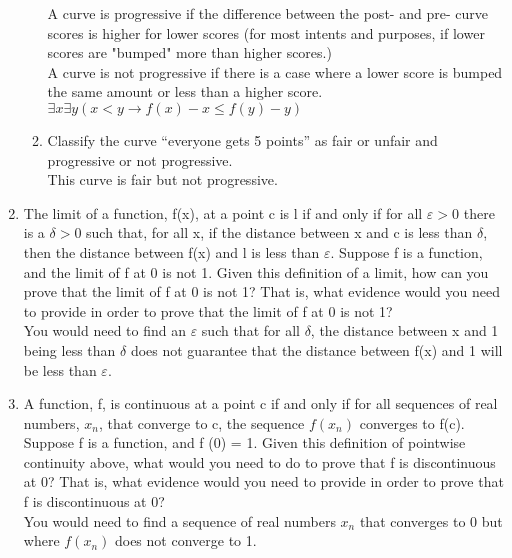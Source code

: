 \documentclass{article}
\begin{document}
\begin{enumerate}
\begin{enumerate}
                        A curve is progressive if the difference between the post- and pre- curve scores is higher for lower scores (for most intents and purposes, if lower scores are "bumped" more than higher scores.)\\
                        A curve is not progressive if there is a case where a lower score is bumped the same amount or less than a higher score. $\exists x \exists y (x < y \to f(x) - x \leq f(y) - y)$
                  \item Classify the curve “everyone gets 5 points” as fair or unfair and progressive or not progressive.\\
                        This curve is fair but not progressive.
            \end{enumerate}
      \item The limit of a function, f(x), at a point c is l if and only if for all $\varepsilon > 0$ there is a $\delta > 0$
            such that, for all x, if the distance between x and c is less than $\delta$, then the distance between
            f(x) and l is less than $\varepsilon$. Suppose f is a function, and the limit of f at 0 is not 1. Given
            this definition of a limit, how can you prove that the limit of f at 0 is not 1? That is, what
            evidence would you need to provide in order to prove that the limit of f at 0 is not 1?\\
            You would need to find an $\varepsilon$ such that for all $\delta$, the distance between x and 1 being less than $\delta$ does not guarantee that the distance between f(x) and 1 will be less than $\varepsilon$.
      \item A function, f, is continuous at a point c if and only if for all sequences of real numbers,
      $x_{n}$, that converge to c, the sequence $f(x_{n})$ converges to f(c). Suppose f is a function, and
      f (0) = 1. Given this definition of pointwise continuity above, what would you need to do
      to prove that f is discontinuous at 0? That is, what evidence would you need to provide in
      order to prove that f is discontinuous at 0?\\
      You would need to find a sequence of real numbers $x_{n}$ that converges to 0 but where $f(x_{n})$ does not converge to 1.
\end{enumerate}
\end{document}
